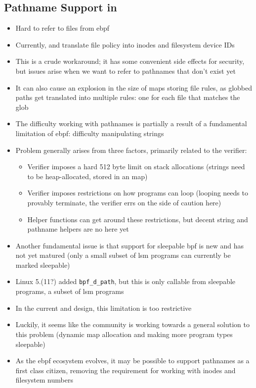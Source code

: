 \subsection{Pathname Support in }

\begin{inprogress}
  \begin{itemize}
    \item Hard to refer to files from \gls{ebpf}
    \item Currently, \bpfbox{} and \bpfcontain{} translate file policy into inodes and filesystem device IDs
    \item This is a crude workaround; it has some convenient side effects for security,
    but issues arise when we want to refer to pathnames that don't exist yet
    \item It can also cause an explosion in the size of maps storing file rules, as
    globbed paths get translated into multiple rules: one for each file that matches the
    glob

    \item The difficulty working with pathnames is partially a result of a fundamental limitation of \gls{ebpf}: difficulty manipulating strings
    \item Problem generally arises from three factors, primarily related to the verifier:
    \begin{itemize}
      \item Verifier imposes a hard 512 byte limit on stack allocations (strings need to be heap-allocated, stored in an map)
      \item Verifier imposes restrictions on how programs can loop (looping needs to provably terminate, the verifier errs on the side of caution here)
      \item Helper functions can get around these restrictions, but decent string and pathname helpers are no here yet
    \end{itemize}
    \item Another fundamental issue is that support for sleepable \gls{bpf} is new and has
    not yet matured (only a small subset of \gls{lsm} programs can currently be marked
    sleepable)
    \item Linux 5.(11?) added \texttt{bpf\_d\_path}, but this is only callable from sleepable programs, a subset of \gls{lsm} programs
    \item In the current \bpfbox{} and \bpfcontain{} design, this limitation is too restrictive
    \item Luckily, it seems like the community is working towards a general solution to
    this problem (dynamic map allocation and making more program types sleepable)
    \item As the \gls{ebpf} ecosystem evolves, it may be possible to support pathnames as
    a first class citizen, removing the requirement for working with inodes and filesystem
    numbers
  \end{itemize}
\end{inprogress}

